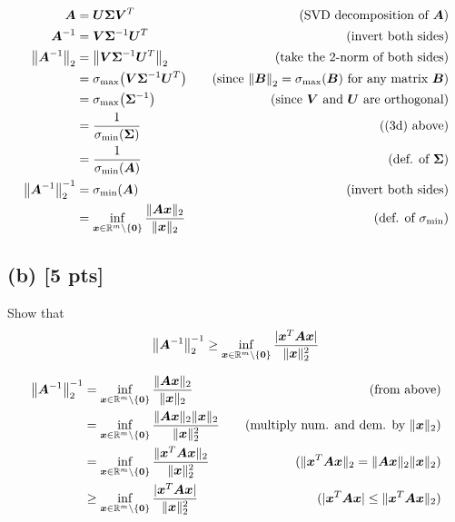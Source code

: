 \documentclass[twoside,10pt]{article}
\begin{document}
\begin{align*}
  \mtx{A} &= \mtx{U} \mtx{\Sigma} \mtx{V}^T&\quad\text{(SVD decomposition of $\mtx{A}$)}\\
  \mtx{A}^{-1} &= \mtx{V} \mtx{\Sigma}^{-1} \mtx{U}^T&\quad\text{(invert both sides)}\\
  \left\|\mtx{A}^{-1}\right\|_2 &= \left\|\mtx{V} \mtx{\Sigma}^{-1} \mtx{U}^T\right\|_2&\quad\text{(take the 2-norm of both sides)}\\
  &= \sigma_{\mathrm{max}}\left(\mtx{V} \mtx{\Sigma}^{-1} \mtx{U}^T\right)&\quad\text{(since $\left\|\mtx{B}\right\|_2 = \sigma_{\mathrm{max}}\left(\mtx{B}\right)$ for any matrix $\mtx{B}$)}\\
  &= \sigma_{\mathrm{max}}\left(\mtx{\Sigma}^{-1}\right)&\quad\text{(since $\mtx{V}$ and $\mtx{U}$ are orthogonal)}\\
  &= \frac{1}{\sigma_{\mathrm{min}}\left(\mtx{\Sigma}\right)}&\quad\text{((3d) above)}\\
  &= \frac{1}{\sigma_{\mathrm{min}}\left(\mtx{A}\right)}&\quad\text{(def. of $\mtx{\Sigma}$)}\\
  \left\|\mtx{A}^{-1}\right\|_2^{-1} &= \sigma_{\mathrm{min}}\left(\mtx{A}\right)&\quad\text{(invert both sides)}\\
  &=  \inf \limits_{\vct{x} \in \R^m \setminus \{\vct{0}\}} \frac{\|\mtx{A}\vct{x}\|_2}{\|\vct{x}\|_2}&\quad\text{(def. of $\sigma_\mathrm{min}$)}
\end{align*}

\subsection*{(b) [5 pts]}
Show that 
\begin{equation}
  \left\|\mtx{A}^{-1}\right\|_2^{-1} \geq \inf \limits_{\vct{x} \in \R^m \setminus \{\vct{0}\}} \frac{|\vct{x}^T \mtx{A}\vct{x}|}{\|\vct{x}\|_2^2}
\end{equation}

\begin{align*}
  \left\|\mtx{A}^{-1}\right\|_2^{-1} &= \inf \limits_{\vct{x} \in \R^m \setminus \{\vct{0}\}} \frac{\|\mtx{A}\vct{x}\|_2}{\|\vct{x}\|_2}&\quad\text{(from above)}\\
  &= \inf \limits_{\vct{x} \in \R^m \setminus \{\vct{0}\}} \frac{\|\mtx{A}\vct{x}\|_2\|\vct{x}\|_2}{\|\vct{x}\|_2^2}&\quad\text{(multiply num. and dem. by $\|\vct{x}\|_2$)}\\
  &= \inf \limits_{\vct{x} \in \R^m \setminus \{\vct{0}\}} \frac{\|\vct{x}^T \mtx{A}\vct{x}\|_2}{\|\vct{x}\|_2^2}&\quad\text{($\|\vct{x}^T \mtx{A}\vct{x}\|_2 = \|\mtx{A}\vct{x}\|_2 \|\vct{x}\|_2$)}\\
  &\geq \inf \limits_{\vct{x} \in \R^m \setminus \{\vct{0}\}} \frac{|\vct{x}^T \mtx{A}\vct{x}|}{\|\vct{x}\|_2^2}&\quad\text{($|\vct{x}^T \mtx{A}\vct{x}| \le \|\vct{x}^T \mtx{A}\vct{x}\|_2$)}
\end{align*}
\end{document}
